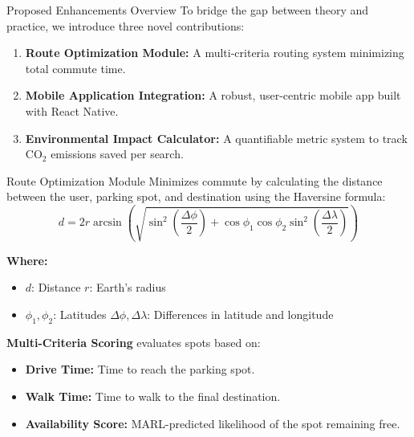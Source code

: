 \documentclass{beamer}
\begin{document}
\begin{frame}{Proposed Enhancements Overview}
  To bridge the gap between theory and practice, we introduce three novel contributions:
  \vspace{0.5cm}
  \begin{enumerate}
      \item \textbf{Route Optimization Module:} A multi-criteria routing system minimizing total commute time.
      \item \textbf{Mobile Application Integration:} A robust, user-centric mobile app built with React Native.
      \item \textbf{Environmental Impact Calculator:} A quantifiable metric system to track CO$_2$ emissions saved per search.
  \end{enumerate}
\end{frame}

\begin{frame}{Route Optimization Module}
  Minimizes commute by calculating the distance between the user, parking spot, and destination using the Haversine formula:
  \begin{equation*}
      d = 2r \arcsin\left(\sqrt{\sin^2\left(\frac{\Delta \phi}{2}\right) + \cos\phi_1\cos\phi_2\sin^2\left(\frac{\Delta \lambda}{2}\right)}\right)
  \end{equation*}
  
  \textbf{Where:}
  \begin{itemize}
      \item $d$: Distance \quad $r$: Earth's radius
      \item $\phi_1, \phi_2$: Latitudes \quad $\Delta \phi, \Delta \lambda$: Differences in latitude and longitude
  \end{itemize}
  
  \textbf{Multi-Criteria Scoring} evaluates spots based on:
  \begin{itemize}
      \item \textbf{Drive Time:} Time to reach the parking spot.
      \item \textbf{Walk Time:} Time to walk to the final destination.
      \item \textbf{Availability Score:} MARL-predicted likelihood of the spot remaining free.
  \end{itemize}
\end{frame}
\end{document}
